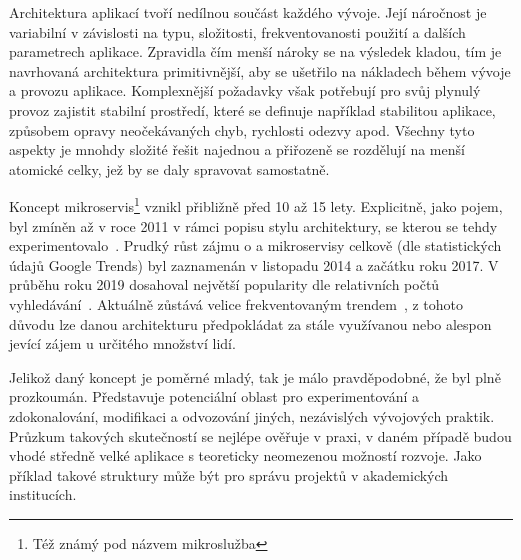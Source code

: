 Architektura aplikací tvoří nedílnou součást každého vývoje.
Její náročnost je variabilní v závislosti na typu, složitosti, frekventovanosti použití a dalších parametrech aplikace.
Zpravidla čím menší nároky se na výsledek kladou, tím je navrhovaná architektura primitivnější, aby se ušetřilo na nákladech během vývoje a provozu aplikace.
Komplexnější požadavky však potřebují pro svůj plynulý provoz zajistit stabilní prostředí, které se definuje například stabilitou aplikace, způsobem opravy neočekávaných chyb, rychlosti odezvy apod.
Všechny tyto aspekty je mnohdy složité řešit najednou a přiřozeně se rozdělují na menší atomické celky, jež by se daly spravovat samostatně.

Koncept mikroservis\footnote{Též známý pod názvem mikroslužba} vznikl přibližně před 10 až 15 lety.
Explicitně, jako pojem, byl zmíněn až v roce 2011 v rámci popisu stylu architektury, se kterou se tehdy experimentovalo~\cite{msabegin}.
Prudký růst zájmu o  a mikroservisy celkově (dle statistických údajů Google Trends) byl zaznamenán v listopadu 2014 a začátku roku 2017.
V průběhu roku 2019 dosahoval největší popularity dle relativních počtů vyhledávání~\cite{googletrendsmsa}.
Aktuálně  zůstává velice frekventovaným trendem~\cite{googletrendsmsa}, z tohoto důvodu lze danou architekturu předpokládat za stále využívanou nebo alespon jevící zájem u určitého množství lidí.

Jelikož daný koncept je poměrné mladý, tak je málo pravděpodobné, že byl plně prozkoumán.
Představuje potenciální oblast pro experimentování a zdokonalování, modifikaci a odvozování jiných, nezávislých vývojových praktik.
Průzkum takových skutečností se nejlépe ověřuje v praxi, v daném případě budou vhodé středně velké aplikace s teoreticky neomezenou možností rozvoje.
Jako příklad takové struktury může být  pro správu projektů v akademických institucích.

\clearpage



